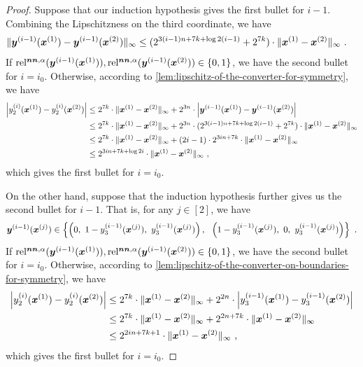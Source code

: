 \begin{proof}
    Suppose that our induction hypothesis gives the first bullet for $i-1$.
    Combining the Lipschitzness on the third coordinate, we have 
    \begin{align*}
        \| {\boldsymbol{y}^{(i-1)}(\boldsymbol{x}^{(1)})-\boldsymbol{y}^{(i-1)}(\boldsymbol{x}^{(2)})} \|_{\infty} &\leq (2^{3(i-1)n+7 k + \log 2(i-1)}+2^{7k}) \cdot \| {\boldsymbol{x}^{(1)}-\boldsymbol{x}^{(2)}} \|_{\infty}~. 
    \end{align*}
    If $\operatorname*{rel^{\boldsymbol{nn},\alpha}}(\boldsymbol{y}^{(i-1)}(\boldsymbol{x}^{(1)})), \operatorname*{rel^{\boldsymbol{nn},\alpha}}(\boldsymbol{y}^{(i-1)}(\boldsymbol{x}^{(2)})) \in \{0,1\}$, we have the second bullet for $i=i_0$.
    Otherwise, according to \cref{lem:lipschitz-of-the-converter-for-symmetry}, we have 
    \begin{align*}
        \left |{y_2^{(i)}(\boldsymbol{x}^{(1)})-y_2^{(i)}(\boldsymbol{x}^{(2)})} \right | 
        &\leq 
        2^{7k}\cdot \| {\boldsymbol{x}^{(1)}-\boldsymbol{x}^{(2)}} \|_{\infty} + 2^{3n} \cdot \left |{\boldsymbol{y}^{(i-1)}(\boldsymbol{x}^{(1)}) - \boldsymbol{y}^{(i-1)}(\boldsymbol{x}^{(2)})} \right |
        \\
        &\leq
        2^{7k}\cdot \| {\boldsymbol{x}^{(1)}-\boldsymbol{x}^{(2)}} \|_{\infty} + 2^{3n}\cdot (2^{3(i-1)n+7k+\log 2(i-1)}+2^{7k}) \cdot \| {\boldsymbol{x}^{(1)}-\boldsymbol{x}^{(2)}} \|_{\infty}
        \\
        &\leq
        2^{7k}\cdot \| {\boldsymbol{x}^{(1)}-\boldsymbol{x}^{(2)}} \|_{\infty} + (2i-1)\cdot 2^{3in+7k}\cdot \| {\boldsymbol{x}^{(1)}-\boldsymbol{x}^{(2)}} \|_{\infty}
        \\
        &\leq 
        2^{3in+7k + \log 2i}\cdot \| {\boldsymbol{x}^{(1)}-\boldsymbol{x}^{(2)}} \|_{\infty} ~,
    \end{align*}
    which gives the first bullet for $i=i_0$.

    On the other hand, suppose that the induction hypothesis further gives us the second bullet for $i-1$. 
    That is, for any $j\in [2]$, we have 
    \[
        \vec{y}^{(i-1)}(\vec{x}^{(j)}) \in \set{\left(0,\ 1-y_3^{(i-1)}(\vec{x}^{(j)}),\ y_3^{(i-1)}(\vec{x}^{(j)})\right), ~~ \left(1-y_3^{(i-1)}(\vec{x}^{(j)}),\ 0,\ y_3^{(i-1)}(\vec{x}^{(j)})\right)}~.
    \]
    If $\operatorname*{rel^{\boldsymbol{nn},\alpha}}(\boldsymbol{y}^{(i-1)}(\boldsymbol{x}^{(1)})), \operatorname*{rel^{\boldsymbol{nn},\alpha}}(\boldsymbol{y}^{(i-1)}(\boldsymbol{x}^{(2)})) \in \{0,1\}$, we have the second bullet for $i=i_0$.
    Otherwise, according to \cref{lem:lipschitz-of-the-converter-on-boundaries-for-symmetry}, we have 
    \begin{align*}
        \left |{y_2^{(i)}(\boldsymbol{x}^{(1)})-y_2^{(i)}(\boldsymbol{x}^{(2)})} \right | 
        &\leq 
        2^{7k}\cdot \| {\boldsymbol{x}^{(1)}-\boldsymbol{x}^{(2)}} \|_{\infty} + 2^{2n} \cdot \left |{y_3^{(i-1)}(\boldsymbol{x}^{(1)}) - y_3^{(i-1)}(\boldsymbol{x}^{(2)})} \right |
        \\
        &\leq
        2^{7k}\cdot \| {\boldsymbol{x}^{(1)}-\boldsymbol{x}^{(2)}} \|_{\infty} + 2^{2n+7k} \cdot \| {\boldsymbol{x}^{(1)}-\boldsymbol{x}^{(2)}} \|_{\infty}
        \\
        &\leq 
        2^{2in+7k+1}\cdot \| {\boldsymbol{x}^{(1)}-\boldsymbol{x}^{(2)}} \|_{\infty} ~, 
    \end{align*}
    which gives the first bullet for $i=i_0$.
\end{proof}

